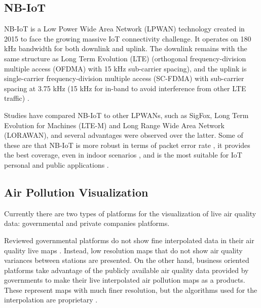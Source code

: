 \subsection{NB-IoT}

NB-IoT is a Low Power Wide Area Network (LPWAN) technology created in 2015 to face the growing massive IoT connectivity challenge. It operates on 180 kHz bandwidth for both downlink and uplink. The downlink remains with the same structure as Long Term Evolution (LTE) (orthogonal frequency-division multiple access (OFDMA) with 15 kHz sub-carrier spacing), and the uplink is single-carrier frequency-division multiple access (SC-FDMA) with sub-carrier spacing at 3.75 kHz (15 kHz for in-band to avoid interference from other LTE traffic) \cite{Ratasuk2016}.

Studies have compared NB-IoT to other LPWANs, such as SigFox, Long Term Evolution for Machines (LTE-M) and Long Range Wide Area Network (LORAWAN), and several advantages were observed over the latter. Some of these are that NB-IoT is more robust in terms of packet error rate \cite{Mroue2018}, it provides the best coverage, even in indoor scenarios \cite{Lauridsen2017}, and is the most suitable for IoT personal and public applications \cite{Zanella2016}.

\subsection{Air Pollution Visualization}

Currently there are two types of platforms for the visualization of live air quality data: governmental and private companies platforms.

Reviewed governmental platforms do not show fine interpolated data in their air quality live maps \cite{QualAr} \cite{U.S.EnvironmentProtectionAgency}. Instead, low resolution maps that do not show air quality variances between stations are presented. On the other hand, business oriented platforms take advantage of the publicly available air quality data provided by governments to make their live interpolated air pollution maps as a products. These represent maps with much finer resolution, but the algorithms used for the interpolation are proprietary \cite{Breezometer}.

